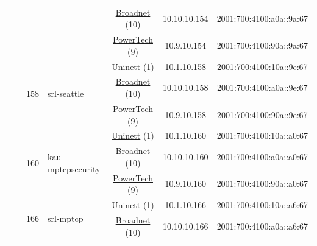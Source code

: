 \begin{small}
\begin{center}
\begin{longtable}{|c|c|c|c|c|c|c|c|}
  &  &  &  & \multicolumn{2}{|c|}{\tiny{\href{https://www.broadnet.no}{Broadnet} (10)}} & \tiny{10.10.10.154} & \tiny{2001:700:4100:a0a::9a:67} \\* \cline{5-5}\cline{6-6}\cline{7-7}\cline{8-8}
  &  &  &  & \multicolumn{2}{|c|}{\tiny{\href{http://www.powertech.no}{PowerTech} (9)}} & \tiny{10.9.10.154} & \tiny{2001:700:4100:90a::9a:67} \\* \cline{3-3}\cline{4-4}\cline{5-5}\cline{6-6}\cline{7-7}\cline{8-8}
  &  & \multirow{3}{*}{\tiny{158}} & \multicolumn{1}{|l|}{\multirow{3}{*}{\tiny{srl-seattle}}} & \multicolumn{2}{|c|}{\tiny{\href{https://www.uninett.no}{Uninett} (1)}} & \tiny{10.1.10.158} & \tiny{2001:700:4100:10a::9e:67} \\* \cline{5-5}\cline{6-6}\cline{7-7}\cline{8-8}
  &  &  &  & \multicolumn{2}{|c|}{\tiny{\href{https://www.broadnet.no}{Broadnet} (10)}} & \tiny{10.10.10.158} & \tiny{2001:700:4100:a0a::9e:67} \\* \cline{5-5}\cline{6-6}\cline{7-7}\cline{8-8}
  &  &  &  & \multicolumn{2}{|c|}{\tiny{\href{http://www.powertech.no}{PowerTech} (9)}} & \tiny{10.9.10.158} & \tiny{2001:700:4100:90a::9e:67} \\* \cline{3-3}\cline{4-4}\cline{5-5}\cline{6-6}\cline{7-7}\cline{8-8}
  &  & \multirow{3}{*}{\tiny{160}} & \multicolumn{1}{|l|}{\multirow{3}{*}{\tiny{kau-mptcpsecurity}}} & \multicolumn{2}{|c|}{\tiny{\href{https://www.uninett.no}{Uninett} (1)}} & \tiny{10.1.10.160} & \tiny{2001:700:4100:10a::a0:67} \\* \cline{5-5}\cline{6-6}\cline{7-7}\cline{8-8}
  &  &  &  & \multicolumn{2}{|c|}{\tiny{\href{https://www.broadnet.no}{Broadnet} (10)}} & \tiny{10.10.10.160} & \tiny{2001:700:4100:a0a::a0:67} \\* \cline{5-5}\cline{6-6}\cline{7-7}\cline{8-8}
  &  &  &  & \multicolumn{2}{|c|}{\tiny{\href{http://www.powertech.no}{PowerTech} (9)}} & \tiny{10.9.10.160} & \tiny{2001:700:4100:90a::a0:67} \\* \cline{3-3}\cline{4-4}\cline{5-5}\cline{6-6}\cline{7-7}\cline{8-8}
  &  & \multirow{3}{*}{\tiny{166}} & \multicolumn{1}{|l|}{\multirow{3}{*}{\tiny{srl-mptcp}}} & \multicolumn{2}{|c|}{\tiny{\href{https://www.uninett.no}{Uninett} (1)}} & \tiny{10.1.10.166} & \tiny{2001:700:4100:10a::a6:67} \\* \cline{5-5}\cline{6-6}\cline{7-7}\cline{8-8}
  &  &  &  & \multicolumn{2}{|c|}{\tiny{\href{https://www.broadnet.no}{Broadnet} (10)}} & \tiny{10.10.10.166} & \tiny{2001:700:4100:a0a::a6:67} \\* \cline{5-5}\cline{6-6}\cline{7-7}\cline{8-8}

\end{longtable}
\end{center}
\end{small}
